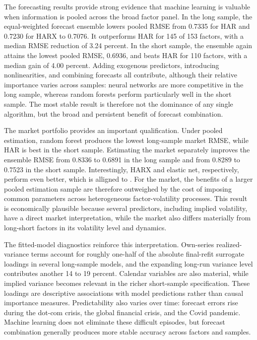 \documentclass[preprint,12pt,authoryear]{elsarticle}
\begin{document}
The forecasting results provide strong evidence that machine learning is valuable when information is pooled across the broad factor panel. In the long sample, the equal-weighted forecast ensemble lowers pooled RMSE from 0.7335 for HAR and 0.7230 for HARX to 0.7076. It outperforms HAR for 145 of 153 factors, with a median RMSE reduction of 3.24 percent. In the short sample, the ensemble again attains the lowest pooled RMSE, 0.6936, and beats HAR for 110 factors, with a median gain of 4.00 percent. Adding exogenous predictors, introducing nonlinearities, and combining forecasts all contribute, although their relative importance varies across samples: neural networks are more competitive in the long sample, whereas random forests perform particularly well in the short sample. The most stable result is therefore not the dominance of any single algorithm, but the broad and persistent benefit of forecast combination.

The market portfolio provides an important qualification. Under pooled estimation, random forest produces the lowest long-sample market RMSE, while HAR is best in the short sample. Estimating the market separately improves the ensemble RMSE from 0.8336 to 0.6891 in the long sample and from 0.8289 to 0.7523 in the short sample. Interestingly, HARX and elastic net, respectively, perform even better, which is alligned to \citet{brancorubesamzevallos2024}. For the market, the benefits of a larger pooled estimation sample are therefore outweighed by the cost of imposing common parameters across heterogeneous factor-volatility processes. This result is economically plausible because several predictors, including implied volatility, have a direct market interpretation, while the market also differs materially from long-short factors in its volatility level and dynamics. 

The fitted-model diagnostics reinforce this interpretation. Own-series realized-variance terms account for roughly one-half of the absolute final-refit surrogate loadings in several long-sample models, and the expanding long-run variance level contributes another 14 to 19 percent. Calendar variables are also material, while implied variance becomes relevant in the richer short-sample specification. These loadings are descriptive associations with model predictions rather than causal importance measures. Predictability also varies over time: forecast errors rise during the dot-com crisis, the global financial crisis, and the Covid pandemic. Machine learning does not eliminate these difficult episodes, but forecast combination generally produces more stable accuracy across factors and samples.
\end{document}
